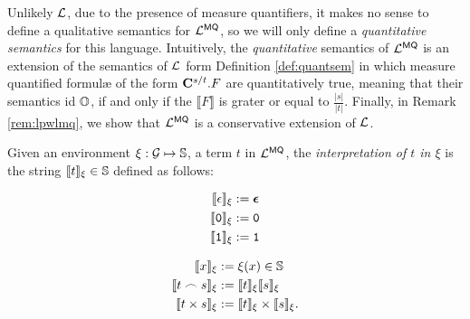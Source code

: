 Unlikely $\mathcal{L}$, due to the presence of measure quantifiers,
it makes no sense to define a qualitative semantics for $\mathcal{L}^{\mathsf{MQ}}$,
so we will only define a \emph{quantitative semantics} for this language.
%
Intuitively, the \emph{quantitative} semantics of $\mathcal{L}^{\mathsf{MQ}}$ is an extension of
the semantics of $\mathcal{L}$ form Definition \ref{def:quantsem} in which measure quantified formul\ae{} of the form $\mathbf{C}^{s/t}.F$
are quantitatively true, meaning that their semantics id $\mathbb{O}$, if and only if
the $\llbracket F\rrbracket$ is grater or equal to $\frac {|s|}{|t|}$.
Finally, in Remark \ref{rem:lpwlmq}, we show that
$\mathcal{L}^{\mathsf{MQ}}$ is a conservative extension of $\mathcal{L}$.






\begin{defn}\label{df:termslmq}
Given an environment $\xi:\mathcal{G}\mapsto \mathbb{S}$,
a term $t$ in $\mathcal{L}^{\mathsf{MQ}}$,
the \emph{interpretation of $t$ in $\xi$}
is the string $\llbracket t\rrbracket_\xi \in \mathbb{S}$
defined as follows:

\begin{minipage}{\linewidth}
\begin{minipage}[t]{0.4\linewidth}
\begin{align*}
\llbracket \epsilon\rrbracket_\xi &:= \bm{\epsilon} \\
\llbracket \mathtt{0}\rrbracket_\xi &:= \mathtt{0} \\
\llbracket \mathtt{1} \rrbracket_\xi &:=\mathtt{1}
\end{align*}
\end{minipage}
\hfill
\begin{minipage}[t]{0.6\linewidth}
\begin{align*}
\llbracket x\rrbracket_\xi &:= \xi(x) \in \mathbb{S} \\
\llbracket t\frown s\rrbracket_\xi &:=\llbracket t\rrbracket_\xi
 \llbracket s\rrbracket_\xi \\
\llbracket t\times s\rrbracket_\xi &:=\llbracket t\rrbracket_\xi
\times \llbracket s\rrbracket_\xi.
\end{align*}
\end{minipage}
\end{minipage}
\end{defn}


